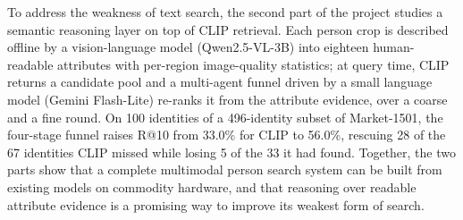 To address the weakness of text search, the second part of the project studies a semantic reasoning layer on top of CLIP retrieval. Each person crop is described offline by a vision-language model (Qwen2.5-VL-3B) into eighteen human-readable attributes with per-region image-quality statistics; at query time, CLIP returns a candidate pool and a multi-agent funnel driven by a small language model (Gemini Flash-Lite) re-ranks it from the attribute evidence, over a coarse and a fine round. On 100 identities of a 496-identity subset of Market-1501, the four-stage funnel raises R@10 from 33.0\% for CLIP to 56.0\%, rescuing 28 of the 67 identities CLIP missed while losing 5 of the 33 it had found. Together, the two parts show that a complete multimodal person search system can be built from existing models on commodity hardware, and that reasoning over readable attribute evidence is a promising way to improve its weakest form of search.
